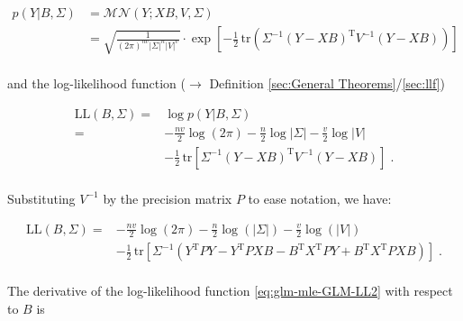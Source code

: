 \documentclass[a4paper,12pt,twoside]{book}
\begin{document}
\begin{equation} \label{eq:glm-mle-GLM-LF}
\begin{split}
p(Y|B,\Sigma) &= \mathcal{MN}(Y; XB, V, \Sigma) \\
&= \sqrt{\frac{1}{(2\pi)^{nv} |\Sigma|^n |V|^v}} \cdot \exp\left[ -\frac{1}{2} \, \mathrm{tr}\left( \Sigma^{-1} (Y - XB)^\mathrm{T} V^{-1} (Y - XB) \right)  \right] \\
\end{split}
\end{equation}

and the log-likelihood function ($\rightarrow$ Definition \ref{sec:General Theorems}/\ref{sec:llf})

\begin{equation} \label{eq:glm-mle-GLM-LL1}
\begin{split}
\mathrm{LL}(B,\Sigma) = &\log p(Y|B,\Sigma) \\
= &- \frac{nv}{2} \log(2\pi) - \frac{n}{2} \log |\Sigma| - \frac{v}{2} \log |V| \\
&- \frac{1}{2} \, \mathrm{tr}\left[ \Sigma^{-1} (Y - XB)^\mathrm{T} V^{-1} (Y - XB) \right] \; .\\
\end{split}
\end{equation}

Substituting $V^{-1}$ by the precision matrix $P$ to ease notation, we have:

\begin{equation} \label{eq:glm-mle-GLM-LL2}
\begin{split}
\mathrm{LL}(B,\Sigma) = &- \frac{nv}{2} \log(2\pi) - \frac{n}{2} \log(|\Sigma|) - \frac{v}{2} \log(|V|) \\
&- \frac{1}{2} \, \mathrm{tr}\left[ \Sigma^{-1} \left( Y^\mathrm{T} P Y - Y^\mathrm{T} P X B - B^\mathrm{T} X^\mathrm{T} P Y + B^\mathrm{T} X^\mathrm{T} P X B \right) \right] \; .\\
\end{split}
\end{equation}

\vspace{1em}
The derivative of the log-likelihood function \eqref{eq:glm-mle-GLM-LL2} with respect to $B$ is
\end{document}
